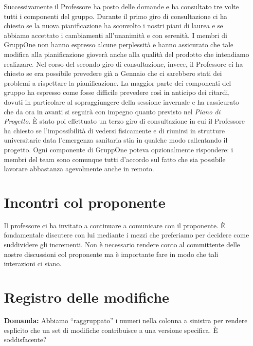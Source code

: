 \documentclass{article}
\begin{document}
Successivamente il Professore ha posto delle domande e ha consultato tre volte tutti i componenti del gruppo.
Durante il primo giro di consultazione ci ha chiesto se la nuova pianificazione ha sconvolto i nostri piani di laurea e se abbiamo accettato i cambiamenti all'unanimità e con serenità.
I membri di GruppOne non hanno espresso alcune perplessità e hanno assicurato che tale modifica alla pianificazione gioverà anche alla qualità del prodotto che intendiamo realizzare.
Nel corso del secondo giro di consultazione, invece, il Professore ci ha chiesto se era possibile prevedere già a Gennaio che ci sarebbero stati dei problemi a rispettare la pianificazione.
La maggior parte dei componenti del gruppo ha espresso come fosse difficile prevedere così in anticipo dei ritardi, dovuti in particolare al sopraggiungere della sessione invernale e ha rassicurato che da ora in avanti si seguirà con impegno quanto previsto nel \textit{Piano di Progetto}.
È stato poi effettuato un terzo giro di consultazione in cui il Professore ha chiesto se l'impossibilità di vedersi fisicamente e di riunirsi in strutture universitarie data l'emergenza sanitaria stia in qualche modo rallentando il progetto. Ogni componente di GruppOne poteva opzionalmente rispondere: i membri del team sono comunque tutti d'accordo sul fatto che sia possibile lavorare abbastanza agevolmente anche in remoto.

\section{Incontri col proponente}%
\label{sec:incontri_col_proponente}

Il professore ci ha invitato a continuare a comunicare con il proponente.
È fondamentale discutere con lui mediante i mezzi che preferiamo per decidere come suddividere gli incrementi.
Non è necessario rendere conto al committente delle nostre discussioni col proponente ma è importante fare in modo che tali interazioni ci siano.

\section{Registro delle modifiche}%
\label{sec:registro_delle_modifiche}

\textbf{Domanda:} Abbiamo ``raggruppato'' i numeri nella colonna a sinistra per rendere esplicito che un set di modifiche contribuisce a una versione specifica. È soddisfacente?\\
\end{document}
